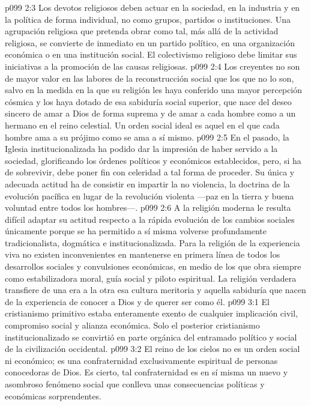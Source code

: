 \vs p099 2:3 \pc Los devotos religiosos deben actuar en la sociedad, en la industria y en la política de forma individual, no como grupos, partidos o instituciones. Una agrupación religiosa que pretenda obrar como tal, más allá de la actividad religiosa, se convierte de inmediato en un partido político, en una organización económica o en una institución social. El colectivismo religioso debe limitar sus iniciativas a la promoción de las causas religiosas.
\vs p099 2:4 Los creyentes no son de mayor valor en las labores de la reconstrucción social que los que no lo son, salvo en la medida en la que su religión les haya conferido una mayor percepción cósmica y los haya dotado de esa sabiduría social superior, que nace del deseo sincero de amar a Dios de forma suprema y de amar a cada hombre como a un hermano en el reino celestial. Un orden social ideal es aquel en el que cada hombre ama a su prójimo como se ama a sí mismo.
\vs p099 2:5 \pc En el pasado, la Iglesia institucionalizada ha podido dar la impresión de haber servido a la sociedad, glorificando los órdenes políticos y económicos establecidos, pero, si ha de sobrevivir, debe poner fin con celeridad a tal forma de proceder. Su única y adecuada actitud ha de consistir en impartir la no violencia, la doctrina de la evolución pacífica en lugar de la revolución violenta ---paz en la tierra y buena voluntad entre todos los hombres---.
\vs p099 2:6 A la religión moderna le resulta difícil adaptar su actitud respecto a la rápida evolución de los cambios sociales únicamente porque se ha permitido a sí misma volverse profundamente tradicionalista, dogmática e institucionalizada. Para la religión de la experiencia viva no existen inconvenientes en mantenerse en primera línea de todos los desarrollos sociales y convulsiones económicas, en medio de los que obra siempre como estabilizadora moral, guía social y piloto espiritual. La religión verdadera transfiere de una era a la otra esa cultura meritoria y aquella sabiduría que nacen de la experiencia de conocer a Dios y de querer ser como él.
\vs p099 3:1 El cristianismo primitivo estaba enteramente exento de cualquier implicación civil, compromiso social y alianza económica. Solo el posterior cristianismo institucionalizado se convirtió en parte orgánica del entramado político y social de la civilización occidental.
\vs p099 3:2 \pc El reino de los cielos no es un orden social ni económico; es una confraternidad exclusivamente espiritual de personas conocedoras de Dios. Es cierto, tal confraternidad es en sí misma un nuevo y asombroso fenómeno social que conlleva unas consecuencias políticas y económicas sorprendentes.
